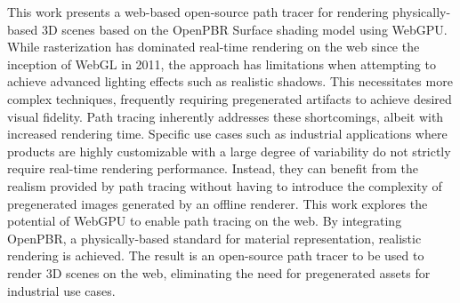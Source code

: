 
This work presents a web-based open-source path tracer for rendering physically-based 3D scenes based on the OpenPBR Surface shading model using WebGPU. While rasterization has dominated real-time rendering on the web since the inception of WebGL in 2011, the approach has limitations when attempting to achieve advanced lighting effects such as realistic shadows. This necessitates more complex techniques, frequently requiring pregenerated artifacts to achieve desired visual fidelity. Path tracing inherently addresses these shortcomings, albeit with increased rendering time. Specific use cases such as industrial applications where products are highly customizable with a large degree of variability do not strictly require real-time rendering performance. Instead, they can benefit from the realism provided by path tracing without having to introduce the complexity of pregenerated images generated by an offline renderer. This work explores the potential of WebGPU to enable path tracing on the web. By integrating OpenPBR, a physically-based standard for material representation, realistic rendering is achieved. The result is an open-source path tracer to be used to render 3D scenes on the web, eliminating the need for pregenerated assets for industrial use cases.

